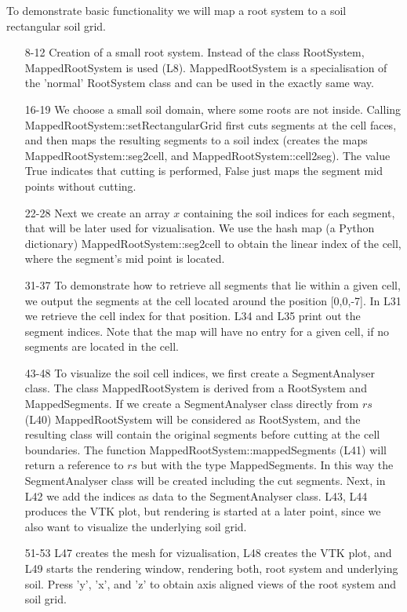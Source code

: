 

To demonstrate basic functionality we will map a root system to a soil rectangular soil grid. 



\begin{itemize}

\item[8-12] Creation of a small root system. Instead of the class RootSystem, MappedRootSystem is used (L8). MappedRootSystem is a specialisation of the 'normal' RootSystem class and can be used in the exactly same way. 

\item[16-19] We choose a small soil domain, where some roots are not inside. Calling MappedRootSystem::setRectangularGrid first cuts segments at the cell faces, and then maps the resulting segments to a soil index (creates the maps MappedRootSystem::seg2cell, and MappedRootSystem::cell2seg). The value True indicates that cutting is performed, False just maps the segment mid points without cutting. 

\item[22-28] Next we create an array $x$ containing the soil indices for each segment, that will be later used for vizualisation. We use the hash map (a Python dictionary) MappedRootSystem::seg2cell to obtain the linear index of the cell, where the segment's mid point is located.

\item[31-37] To demonstrate how to retrieve all segments that lie within a given cell, we output the segments at the cell located around the position [0,0,-7]. In L31 we retrieve the cell index for that position. L34 and L35 print out the segment indices. Note that the map will have no entry for a given cell, if no segments are located in the cell. 

\item[43-48] To visualize the soil cell indices, we first create a SegmentAnalyser class. The class MappedRootSystem is derived from a RootSystem and MappedSegments. If we create a SegmentAnalyser class directly from $rs$ (L40) MappedRootSystem will be considered as RootSystem, and the resulting class will contain the original segments before cutting at the cell boundaries. The function MappedRootSystem::mappedSegments (L41) will return a reference to $rs$ but with the type MappedSegments. In this way the SegmentAnalyser class will be created including the cut segments. Next, in L42 we add the indices as data to the SegmentAnalyser class. L43, L44 produces the VTK plot, but rendering is started at a later point, since we also want to visualize the underlying soil grid.

\item[51-53]  L47 creates the mesh for vizualisation, L48 creates the VTK plot, and L49 starts the rendering window, rendering both, root system and underlying soil. Press 'y', 'x', and 'z' to obtain axis aligned views of the root system and soil grid.

\end{itemize}

